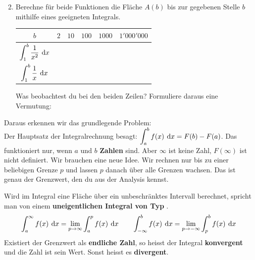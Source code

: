 \begin{aufgabe}
\begin{figure}[H]
		\end{figure}
		\begin{enumerate}[label=\alph*)]
			\setcounter{enumi}{1}
			\item Berechne für beide Funktionen die Fläche $A(b)$ bis zur gegebenen Stelle $b$ mithilfe eines geeigneten Integrals.
			\begingroup
			\renewcommand{\arraystretch}{2}
			\begin{table}[H]
				\centering
				\begin{tabular}{|c|>{\centering\arraybackslash}p{17mm}|>{\centering\arraybackslash}p{17mm}|>{\centering\arraybackslash}p{17mm}|>{\centering\arraybackslash}p{17mm}|>{\centering\arraybackslash}p{17mm}|}\hline
					$b$ & $2$ & $10$ & $100$ & $1000$ & $1'000'000$ \\[2pt]\hline
					$\displaystyle\int_{1}^{b}\frac{1}{x^2}\:\operatorname{d}\!{x}$ & & & & & \\[2pt]\hline
					$\displaystyle\int_{1}^{b}\frac{1}{x}\:\operatorname{d}\!{x}$ & & & & & \\[2pt]\hline
				\end{tabular}
			\end{table}
			\endgroup
			Was beobachtest du bei den beiden Zeilen? Formuliere daraus eine Vermutung:
		\end{enumerate}
	\end{aufgabe}
	Daraus erkennen wir das grundlegende Problem:\\
	Der Hauptsatz der Integralrechnung besagt: $\displaystyle\int_{a}^{b}f(x)\:\operatorname{d}\!{x} = F(b) - F(a)$. Das funktioniert nur, wenn $a$ und $b$ \textbf{Zahlen} sind. Aber $\infty$ ist keine Zahl, $F(\infty)$ ist nicht definiert. Wir brauchen eine neue Idee.  Wir rechnen nur bis zu einer beliebigen Grenze $p$ und lassen $p$ danach über alle Grenzen wachsen. Das ist genau der Grenzwert, den du aus der Analysis kennst.
	\begin{definition}
		Wird im Integral eine Fläche über ein unbeschränktes Intervall berechnet, spricht man von einem \textbf{uneigentlichen Integral von Typ \Romannumeral{1}}.
		\[\int_{a}^{\infty}f(x)\:\operatorname{d}\!{x}=\lim_{p\rightarrow\infty}\int_{a}^{p}f(x)\:\operatorname{d}\!{x} \qquad \int_{-\infty}^{b}f(x)\:\operatorname{d}\!{x}=\lim_{p\rightarrow-\infty}\int_{p}^{b}f(x)\:\operatorname{d}\!{x}\]
		Existiert der Grenzwert als \textbf{endliche Zahl}, so heisst der Integral \textbf{konvergent} und die Zahl ist sein Wert. Sonst heisst es \textbf{divergent}.
	\end{definition}
